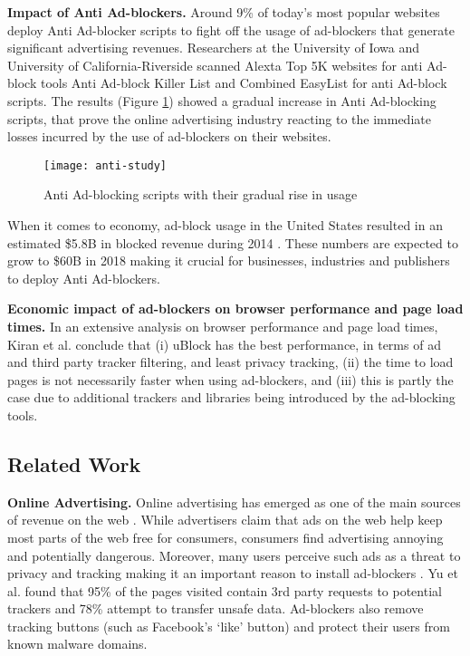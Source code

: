 \documentclass[runningheads,a4paper]{llncs}
\begin{document}
\textbf{Impact of Anti Ad-blockers.} Around 9\% of today's most popular websites \cite{Shitong2017} deploy Anti Ad-blocker scripts to fight off the usage of ad-blockers that generate significant advertising revenues. Researchers at the University of Iowa and University of California-Riverside scanned Alexta Top 5K websites for anti Ad-block tools Anti Ad-block Killer List \cite{aakl} and Combined EasyList for anti Ad-block scripts. The results (Figure \ref{fig:anti-study}) showed a gradual increase in Anti Ad-blocking scripts, that prove the online advertising industry reacting to the immediate losses incurred by the use of ad-blockers on their websites.

\begin{figure}
\centering
\texttt{[image: anti-study]}
\caption{Anti Ad-blocking scripts with their gradual rise in usage \cite{popAnti2018}}
\label{fig:anti-study}
\end{figure}

When it comes to economy, ad-block usage in the United States resulted in an estimated \$5.8B in blocked revenue during 2014 \cite{costBlock}. These numbers are expected to grow to \$60B in 2018 making it crucial for businesses, industries and publishers to deploy Anti Ad-blockers.

\textbf{Economic impact of ad-blockers on browser performance and page load times.} In an extensive analysis on browser performance and page load times, Kiran et al.  \cite{Kiran2017} conclude that (i) uBlock has the best performance, in terms of ad and third party tracker filtering, and least privacy tracking, (ii) the time to load pages is not necessarily faster when using ad-blockers, and (iii) this is partly the case due to additional trackers and libraries being introduced by the ad-blocking tools.

\subsection{Related Work}
\textbf{Online Advertising.} Online advertising has emerged as one of the main sources of revenue on the web \cite{largest2017}. While advertisers claim
that ads on the web help keep most parts of the web free for consumers, consumers find advertising annoying
and potentially dangerous. Moreover, many users perceive such ads as a threat to privacy and tracking making it an important reason to install ad-blockers \cite{popularity2017}. Yu et al. \cite{Yu2016} found that 95\% of the pages visited contain 3rd party requests to potential trackers and 78\% attempt to transfer unsafe data. Ad-blockers also remove tracking buttons (such as Facebook’s ‘like’ button) and protect their users
from known malware domains.
\end{document}
